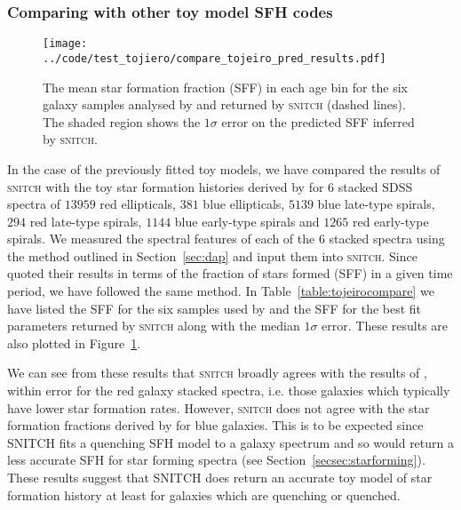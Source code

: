 \documentclass[useAMS,usenatbib]{mn2e}
\begin{document}
\subsubsection{Comparing with other toy model SFH codes}\label{secsec:compare}

\begin{figure}
\centering
\texttt{[image: ../code/test\_tojiero/compare\_tojeiro\_pred\_results.pdf]}
\caption{The mean star formation fraction (SFF) in each age bin for the six galaxy samples analysed by \protect\cite[][solid lines]{tojeiro13} and returned by \textsc{snitch} (dashed lines). The shaded region shows the $1\sigma$ error on the predicted SFF inferred by \textsc{snitch}.}
\label{fig:tojeirocompare}
\end{figure}

In the case of the previously fitted toy models, we have compared the results of \textsc{snitch} with the toy star formation histories derived by \cite{tojeiro13} for $6$ stacked SDSS spectra of $13959$ red ellipticals, $381$ blue ellipticals, $5139$ blue late-type spirals, $294$ red late-type spirals, $1144$ blue early-type spirals and $1265$ red early-type spirals. We measured the spectral features of each of the $6$ stacked spectra using the method outlined in Section~\ref{sec:dap} and input them into \textsc{snitch}. Since \cite{tojeiro13} quoted their results in terms of the fraction of stars formed (SFF) in a given time period, we have followed the same method. In Table~\ref{table:tojeirocompare} we have listed the SFF for the six samples used by \citeauthor{tojeiro13} and the SFF for the best fit parameters returned by \textsc{snitch} along with the median $1\sigma$ error. These results are also plotted in Figure~\ref{fig:tojeirocompare}. 

We can see from these results that \textsc{snitch} broadly agrees with the results of \cite{tojeiro13}, within error for the red galaxy stacked spectra, i.e. those galaxies which typically have lower star formation rates. However, \textsc{snitch} does not agree with the star formation fractions derived by \cite{tojeiro13} for blue galaxies. This is to be expected since \textsc{SNITCH} fits a quenching SFH model to a galaxy spectrum and so would return a less accurate SFH for star forming spectra (see Section~\ref{secsec:starforming}). These results suggest that \textsc{SNITCH} does return an accurate toy model of star formation history at least for galaxies which are quenching or quenched.   
\end{document}
